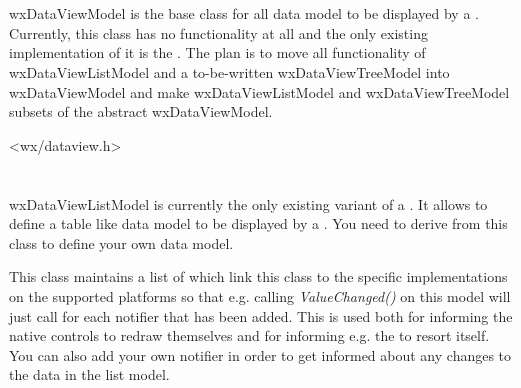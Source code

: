 
\section{}\label{wxdataviewmodel}

wxDataViewModel is the base class for all data model to be
displayed by a . 
Currently, this class has no functionality at all and the
only existing implementation of it is the 
. The
plan is to move all functionality of wxDataViewListModel
and a to-be-written wxDataViewTreeModel into wxDataViewModel
and make wxDataViewListModel and wxDataViewTreeModel subsets
of the abstract wxDataViewModel.




<wx/dataview.h>

\label{wxdataviewmodelwxdataviewmodel}



\label{wxdataviewmodeldtor}



\section{}\label{wxdataviewlistmodel}

wxDataViewListModel is currently the only existing variant
of a . It allows
to define a table like data model to be displayed by a
. You need to derive
from this class to define your own data model.

This class maintains a list of 
which link this class to the specific implementations on the
supported platforms so that e.g. calling {\it ValueChanged()}
on this model will just call 
for each notifier that has been added. This is used both for
informing the native controls to redraw themselves and for informing
e.g. the 
to resort itself. You can also add your own notifier in order
to get informed about any changes to the data in the list model.


